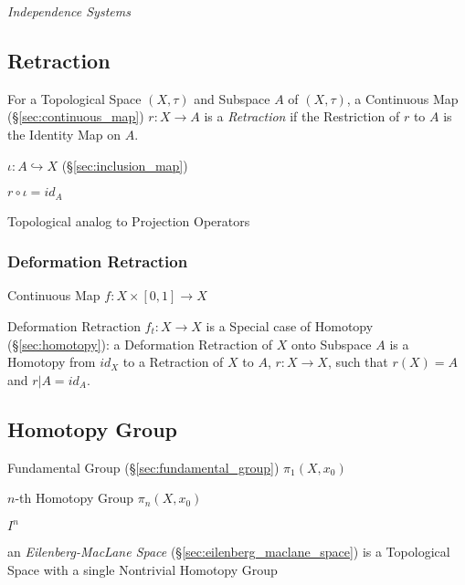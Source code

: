 \emph{Independence Systems}



\subsection{Retraction}\label{sec:subspace_retraction}

For a Topological Space $(X, \tau)$ and Subspace $A$ of $(X,\tau)$, a
Continuous Map (\S\ref{sec:continuous_map}) $r : X \rightarrow A$ is a
\emph{Retraction} if the Restriction of $r$ to $A$ is the Identity Map
on $A$.

$\iota : A \hookrightarrow X$ (\S\ref{sec:inclusion_map})

$r \circ \iota = id_A$

Topological analog to Projection Operators %
\cite{hatcher02}



\subsubsection{Deformation Retraction}\label{sec:deformation_retraction}

Continuous Map $f : X \times [0,1] \rightarrow X$

Deformation Retraction $f_t : X \rightarrow X$ is a Special case of
Homotopy (\S\ref{sec:homotopy}): a Deformation Retraction of $X$ onto
Subspace $A$ is a Homotopy from $id_X$ to a Retraction of $X$ to $A$,
$r : X \rightarrow X$, such that $r(X) = A$ and $r | A = id_A$.
\cite{hatcher02}



\subsection{Homotopy Group}\label{sec:homotopy_group}

Fundamental Group (\S\ref{sec:fundamental_group}) $\pi_1(X,x_0)$

$n$-th Homotopy Group $\pi_n(X,x_0)$

$I^n$

an \emph{Eilenberg-MacLane Space} (\S\ref{sec:eilenberg_maclane_space}) is a
Topological Space with a single Nontrivial Homotopy Group



